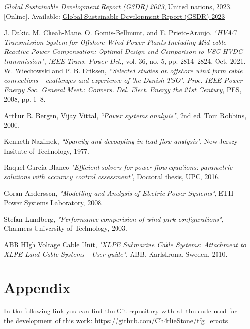 \documentclass[a4paper,11pt, titlepage, twoside]{article}
\begin{document}
 \begin{thebibliography}{99}\label{biblio}
 

 \textit{Global Sustainable Development Report (GSDR) 2023}, United nations, 2023. [Online]. 
 Available: \href{https://sdgs.un.org/gsdr/gsdr2023}{Global Sustainable Development Report (GSDR) 2023}
 
 {J. Dakic, M. Cheah-Mane, O. Gomis-Bellmunt, and E. Prieto-Araujo},
\textit{“HVAC Transmission System for Offshore Wind Power Plants Including
 Mid-cable Reactive Power Compensation: Optimal Design and Comparison to VSC-HVDC transmission"}, \textit{IEEE Trans. Power Del.}, vol. 36,
 no. 5, pp. 2814–2824, Oct. 2021.
 {W. Wiechowski and P. B. Eriksen},
\textit{“Selected studies on offshore wind farm
cable connections - challenges and experience of the Danish TSO"}, \textit{Proc.
IEEE Power Energy Soc. General Meet.: Convers. Del. Elect. Energy the
21st Century}, PES, 2008, pp. 1–8.

 {Arthur R. Bergen, Vijay Vittal},
\textit{“Power systems analysis"}, 2nd ed. Tom Robbins, 2000.

{Kenneth Nazimek},
\textit{“Sparcity and decoupling in load flow analysis"}, New Jersey Insitute of Technology, 1977.

{ Raquel García-Blanco}
\textit{"Efficient solvers for power flow equations: parametric solutions with accuracy control assessment"}, Doctoral thesis, UPC, 2016.


{Goran Andersson},
\textit{"Modelling and Analysis of Electric Power Systems"}, ETH - Power Systems Laboratory, 2008.

{Stefan Lundberg},
\textit{"Performance comparision of wind park configurations"}, Chalmers University of Technology, 2003.

{ABB HIgh Voltage Cable Unit},
\textit{"XLPE Submarine Cable Systems: Attachment to XLPE Land Cable Systems - User guide"}, ABB, Karlskrona, Sweden, 2010.




\end{thebibliography}
 
\section*{Appendix}\label{Appendix}

In the following link you can find the Git repository with all the code used for the development of this work:
\url{https://github.com/Ch4rlieStone/tfg_eroots}
 
\end{document}
